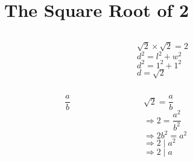 \documentclass{beamer}
\begin{document}
\section{The Square Root of 2}


\begin{frame}
  \begin{columns}
    \begin{column}{0.3\textwidth}
      \centering
    \end{column}
    {\color{gmitgrey!30}\vrule{}} \hspace{0.1\textwidth}
    \begin{column}{0.5\textwidth}
      $\sqrt{2} \times \sqrt{2} = 2$ \\[16mm]
      $d^2 = l^2 + w^2$ \\[4mm]
      $d^2 = 1^2 + 1^2$ \\[4mm]
      $d = \sqrt{2}$ \\[8mm]
    \end{column}
  \end{columns}
\end{frame}

 
\begin{frame}
  \begin{columns}
    \begin{column}{0.3\textwidth}
      \color{gmitblue} \fontsize{30}{10}
      \[\frac{a}{b}\]
    \end{column}
    {\color{gmitgrey!30}\vrule{}} \hspace{0.1\textwidth}
    \begin{column}{0.5\textwidth}
      $\sqrt{2} = \dfrac{a}{b}$ \\[8mm]
      $\Rightarrow 2 = \dfrac{a^2}{b^2}$ \\[8mm]
      $\Rightarrow 2b^2 = a^2$ \\[8mm]
      $\Rightarrow 2 \mid a^2$ \\[8mm]
      $\Rightarrow 2 \mid a$
    \end{column}
  \end{columns}
\end{frame}
\end{document}
